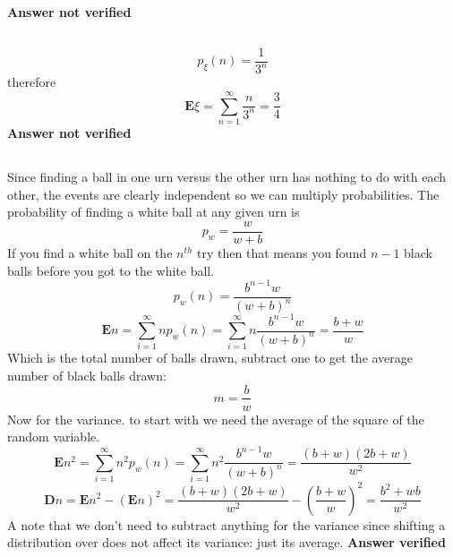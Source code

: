\textbf{Answer not verified}

\subsection{}
\begin{equation}
	p_{\xi}(n) = \frac{1}{3^n}
\end{equation}
therefore
\begin{equation}
	\textbf{E}\xi = \sum_{n=1}^{\infty}\frac{n}{3^n} =  \frac{3}{4}
\label{answer4.11}
\end{equation}
\textbf{Answer not verified}

\subsection{}
Since finding a ball in one urn versus the other urn has nothing to do with each other, the events are clearly independent so we can multiply probabilities.  The probability of finding a white ball at any given urn is
\begin{equation}
	p_w = \frac{w}{w+b}
\end{equation}
If you find a white ball on the $n^{th}$ try then that means you found $n-1$ black balls before you got to the white ball.  
\begin{equation}
	p_w(n) = \frac{b^{n-1} w}{(w+b)^n}
\end{equation}
\begin{equation}
	\textbf{E}n = \sum_{i=1}^{\infty}n p_w(n) = \sum_{i=1}^{\infty}n \frac{b^{n-1} w}{(w+b)^n} = \frac{b+w}{w}
\end{equation}
Which is the total number of balls drawn, subtract one to get the average number of black balls drawn:
\begin{equation}
	m=\frac{b}{w}
\end{equation}
Now for the variance. to start with we need the average of the square of the random variable.
\begin{equation}
	\textbf{E}n^2 = \sum_{i=1}^{\infty}n^2 p_w(n) = \sum_{i=1}^{\infty}n^2 \frac{b^{n-1} w}{(w+b)^n} = \frac{(b+w) (2 b+w)}{w^2}
\end{equation}
\begin{equation}
	\textbf{D}n = \textbf{E}n^2 - (\textbf{E}n)^2 =  \frac{(b+w) (2 b+w)}{w^2} - \left( \frac{b+w}{w} \right)^2 = \frac{b^2+wb}{w^2}
\end{equation}
A note that we don't need to subtract anything for the variance since shifting a distribution over does not affect its variance: just its average.
\textbf{Answer verified}




